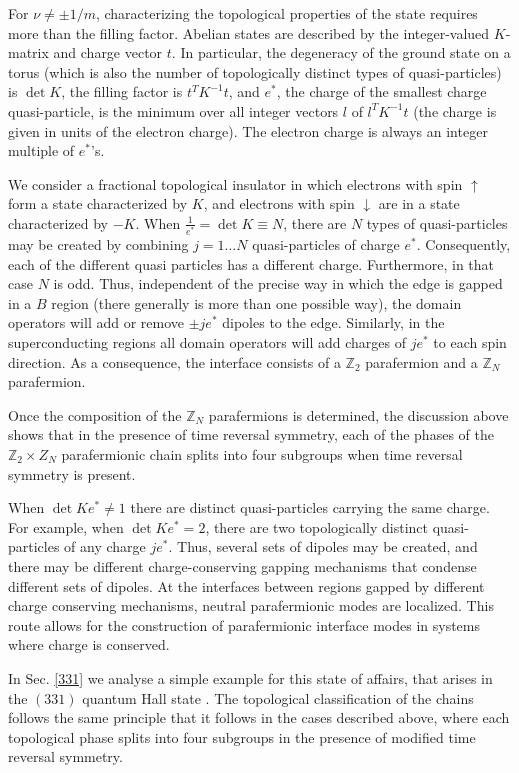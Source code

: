 \documentclass[twocolumn,aps,prb,showpacs]{revtex4-1}
\begin{document}
For $\nu\ne \pm1/m$, characterizing the topological properties of the state requires more than the filling factor. Abelian states are described by the integer-valued $K$-matrix and charge vector $t$. In particular, the degeneracy of the ground state on a torus (which is also the number of topologically distinct types of quasi-particles) is $\det K$, the filling factor is $t^TK^{-1}t$, and $e^*$, the charge of the smallest charge quasi-particle, is the minimum over all integer vectors $l$ of $l^TK^{-1}t$ (the charge is given in units of the electron charge).  The electron charge is always an integer multiple of $e^*$'s.


We consider a fractional topological insulator in which electrons with spin $\uparrow$ form a state characterized by $K$, and electrons with spin $\downarrow$ are in a state characterized by $-K$. When  $\frac{1}{e^*}=\det K\equiv N$, there are  $N$ types of quasi-particles may be created by combining $j=1\dots N$ quasi-particles of charge $e^*$.
Consequently, each of the different quasi particles has a different charge.
Furthermore, in that case $N$ is odd\cite{Note2}. Thus, independent of the precise way in which the edge is gapped in a $B$ region (there generally is more than one possible way), the domain operators will add or remove $\pm je^*$ dipoles to the edge. Similarly, in the superconducting regions all domain operators will add charges of $je^*$ to each spin direction. As a consequence, the interface consists of a $\mathbb{Z}_2$ parafermion and a $\mathbb{Z}_N$ parafermion.


Once the composition of the $ \mathbb{Z}_N$ parafermions is determined, the discussion above shows that in the presence of time reversal symmetry, each of the phases of the $ \mathbb{Z}_2\times Z_N$  parafermionic chain splits into four subgroups when time reversal symmetry is present.


When  $\det{K} e^*\neq 1$  there are  distinct quasi-particles carrying the same charge. For example, when $\det K e^*=2$, there are two topologically distinct quasi-particles of any charge $je^*$. Thus, several sets of dipoles may be created, and there may be different charge-conserving gapping mechanisms that condense different sets of dipoles. At the interfaces between regions gapped by different charge conserving mechanisms, neutral parafermionic modes are localized. This route allows for the construction of parafermionic interface modes in systems where charge is conserved.

In Sec. \ref{331} we analyse a simple example for this state of affairs, that arises in the $(331)$ quantum Hall state \cite{Halperin1983}.
The topological classification of the chains follows the same principle that it follows in the cases described above, where each topological phase splits into four subgroups in the presence of modified time reversal symmetry.
\end{document}
